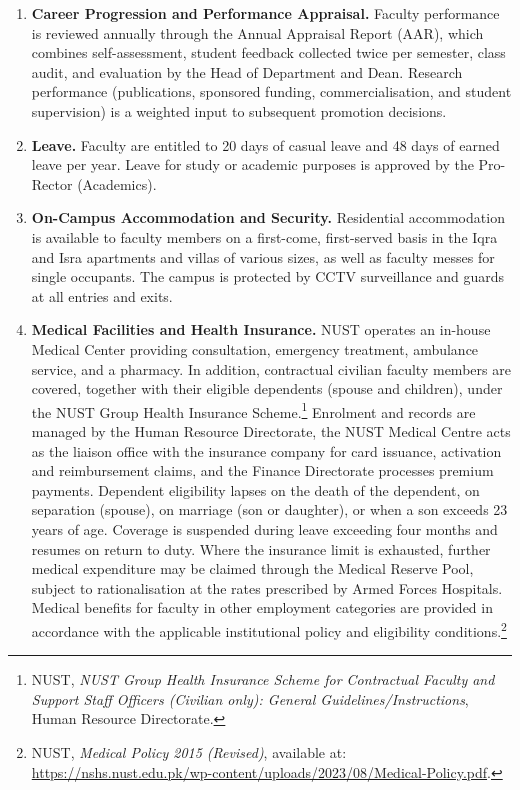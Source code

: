 \begin{enumerate}
    \item \textbf{Career Progression and Performance Appraisal.}
    Faculty performance is reviewed annually through the Annual Appraisal
    Report (AAR), which combines self-assessment, student feedback collected
    twice per semester, class audit, and evaluation by the Head of Department
    and Dean. Research performance (publications, sponsored funding,
    commercialisation, and student supervision) is a weighted input to
    subsequent promotion decisions.

    \item \textbf{Leave.}
    Faculty are entitled to 20 days of casual leave and 48 days of earned
    leave per year. Leave for study or academic purposes is approved by the
    Pro-Rector (Academics).

    \item \textbf{On-Campus Accommodation and Security.}
    Residential accommodation is available to faculty members on a
    first-come, first-served basis in the Iqra and Isra apartments and villas
    of various sizes, as well as faculty messes for single occupants. The
    campus is protected by CCTV surveillance and guards at all entries and
    exits.

    \item \textbf{Medical Facilities and Health Insurance.}
    NUST operates an in-house Medical Center providing consultation,
    emergency treatment, ambulance service, and a pharmacy. In addition,
    contractual civilian faculty members are covered, together with their
    eligible dependents (spouse and children), under the NUST Group Health
    Insurance Scheme.\footnote{NUST, \textit{NUST Group Health Insurance
    Scheme for Contractual Faculty and Support Staff Officers (Civilian
    only): General Guidelines/Instructions}, Human Resource Directorate.}
    Enrolment and records are managed by the Human Resource Directorate, the
    NUST Medical Centre acts as the liaison office with the insurance company
    for card issuance, activation and reimbursement claims, and the Finance
    Directorate processes premium payments. Dependent eligibility lapses on
    the death of the dependent, on separation (spouse), on marriage (son or
    daughter), or when a son exceeds 23 years of age. Coverage is suspended
    during leave exceeding four months and resumes on return to duty. Where
    the insurance limit is exhausted, further medical expenditure may be
    claimed through the Medical Reserve Pool, subject to rationalisation at
    the rates prescribed by Armed Forces Hospitals. Medical benefits for
    faculty in other employment categories are provided in accordance with
    the applicable institutional policy and eligibility
    conditions.\footnote{NUST, \textit{Medical Policy 2015 (Revised)},
    available at:
    \url{https://nshs.nust.edu.pk/wp-content/uploads/2023/08/Medical-Policy.pdf}.}


\end{enumerate}
